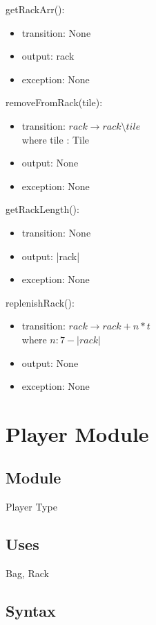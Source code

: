 \documentclass[12pt]{article}
\begin{document}
\noindent getRackArr():
\begin{itemize}
\item transition: None
\item output: rack
\item exception: None
\end{itemize}

\noindent removeFromRack(tile):
\begin{itemize}
\item transition: $rack \rightarrow rack \setminus tile$ \\
where tile : Tile
\item output: None
\item exception: None
\end{itemize}

\noindent getRackLength():
\begin{itemize}
\item transition: None
\item output: |rack|
\item exception: None
\end{itemize}

\noindent replenishRack():
\begin{itemize}
\item transition: $rack \rightarrow rack + n*t$ \\
        where $n : 7 - |rack|$
\item output: None
\item exception: None
\end{itemize}
\medskip
\newpage

\section* {Player Module}

\subsection*{Module}

Player Type

\subsection* {Uses}

Bag, Rack

\subsection* {Syntax}
\end{document}
